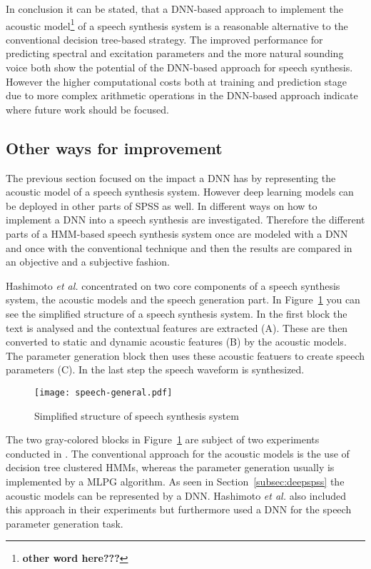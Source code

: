 In conclusion it can be stated, that a \ac{DNN}-based approach to implement the acoustic model\footnote{\textbf{\color{ACMRed} other word here???}} of a speech synthesis system is a reasonable alternative to the conventional decision tree-based strategy. The improved performance for predicting spectral and excitation parameters and the more natural sounding voice both show the potential of the \ac{DNN}-based approach for speech synthesis. However the higher computational costs both at training and prediction stage due to more complex arithmetic operations in the \ac{DNN}-based approach indicate where future work should be focused.

\subsection{Other ways for improvement}
\label{subsec:deepeffect}

The previous section focused on the impact a \ac{DNN} has by representing the acoustic model of a speech synthesis system. However deep learning models can be deployed in other parts of \ac{SPSS} as well. In \cite{hashimoto:effect} different ways on how to implement a \ac{DNN} into a speech synthesis are investigated. Therefore the different parts of a \ac{HMM}-based speech synthesis system once are modeled with a \ac{DNN} and once with the conventional technique and then the results are compared in an objective and a subjective fashion.

Hashimoto \textit{et al.} concentrated on two core components of a speech synthesis system, the acoustic models and the speech generation part. In Figure~\ref{fig:generalspeech} you can see the simplified structure of a speech synthesis system. In the first block the text is analysed and the contextual features are extracted (A). These are then converted to static and dynamic acoustic features (B) by the acoustic models. The parameter generation block then uses these acoustic featuers to create speech parameters (C). In the last step the speech waveform is synthesized.

\begin{figure}[h]
	\texttt{[image: speech-general.pdf]}
	\caption{Simplified structure of speech synthesis system \cite{hashimoto:effect}}
	\label{fig:generalspeech}
\end{figure}

The two gray-colored blocks in Figure~\ref{fig:generalspeech} are subject of two experiments conducted in \cite{hashimoto:effect}. The conventional approach for the acoustic models is the use of decision tree clustered \acp{HMM}, whereas the parameter generation usually is implemented by a \ac{MLPG} algorithm. As seen in Section~\ref{subsec:deepspss} the acoustic models can be represented by a \ac{DNN}. Hashimoto \textit{et al.} also included this approach in their experiments but furthermore used a \ac{DNN} for the speech parameter generation task.

